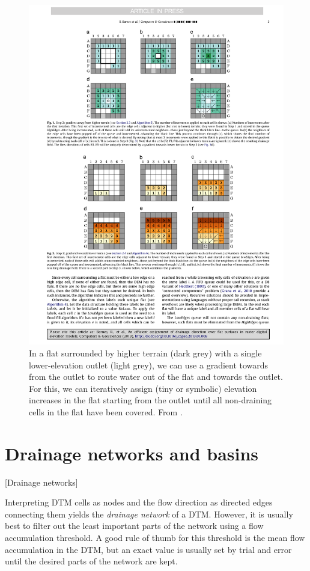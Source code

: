 \begin{figure}[htbp]
\centering
\includegraphics[width=1.0\linewidth]{figs/lt.pdf}
\caption{In a flat surrounded by higher terrain (dark grey) with a single lower-elevation outlet (light grey), we can use a gradient towards from the outlet to route water out of the flat and towards the outlet.
For this, we can iteratively assign (tiny or symbolic) elevation increases in the flat starting from the outlet until all non-draining cells in the flat have been covered.
From \citet{Barnes14}.}%
\label{fig:lt}
\end{figure}


\section{Drainage networks and basins}[Drainage networks]%
\label{sec:drainage_basins}


Interpreting DTM cells as nodes and the flow direction as directed edges connecting them yields the \emph{drainage network} of a DTM\@.
However, it is usually best to filter out the least important parts of the network using a flow accumulation threshold.
A good rule of thumb for this threshold is the mean flow accumulation in the DTM, but an exact value is usually set by trial and error until the desired parts of the network are kept.

